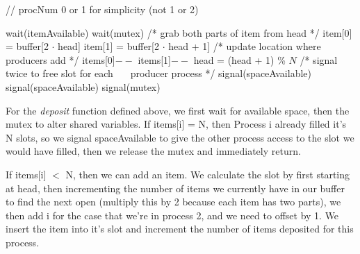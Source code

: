 \documentclass[11pt]{article}
\newcommand{\n}{\vspace{0.3cm}}
\begin{document}
\begin{enumerate}
    \begin{minipage}{0.45\textwidth}
      // procNum 0 or 1 for simplicity (not 1 or 2)
    \end{minipage}
    \begin{minipage}{0.45\textwidth}
      \begin{codebox}
      \li wait(itemAvailable)
      \li wait(mutex)
      \zi
      \zi /* grab both parts of item from head */
      \li item[0] = buffer[2 \(\cdot\) head]
      \li item[1] = buffer[2 \(\cdot\) head + 1]
      \zi
      \zi /* update location where producers add */
      \li items[0]\(--\)
      \li items[1]\(--\)
      \zi
      \li head = (head + 1) \% \(N\)
      \zi
      \zi /* signal twice to free slot for each 
      \zi \(\;\;\;\;\) producer process */
      \li signal(spaceAvailable)
      \li signal(spaceAvailable)
      \zi
      \li signal(mutex)
      \end{codebox}
    \end{minipage} \n
    \newpage

    For the \textit{deposit} function defined above, we first wait for available space, then the mutex to alter shared variables.  If items[i] = N, then Process i already filled it's N slots, so we signal spaceAvailable to give the other process access to the slot we would have filled, then we release the mutex and immediately return.

    If items[i] \(<\) N, then we can add an item.  We calculate the slot by first starting at head, then incrementing the number of items we currently have in our buffer to find the next open (multiply this by 2 because each item has two parts), we then add i for the case that we're in process 2, and we need to offset by 1.  We insert the item into it's slot and increment the number of items deposited for this process.


\end{enumerate}
\end{document}
